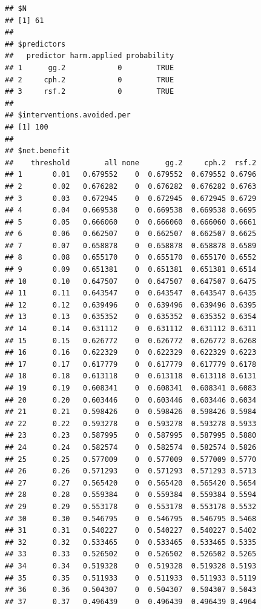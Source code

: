 \documentclass{article}\usepackage[]{graphicx}\usepackage[]{color}
\makeatletter
\newenvironment{kframe}{%
 \def\at@end@of@kframe{}%
 \ifinner\ifhmode%
  \def\at@end@of@kframe{\end{minipage}}%
  \begin{minipage}{\columnwidth}%
 \fi\fi%
 \def\FrameCommand##1{\hskip\@totalleftmargin \hskip-\fboxsep
 \colorbox{shadecolor}{##1}\hskip-\fboxsep
     \hskip-\linewidth \hskip-\@totalleftmargin \hskip\columnwidth}%
 \MakeFramed {\advance\hsize-\width
   \@totalleftmargin\z@ \linewidth\hsize
   \@setminipage}}%
 {\par\unskip\endMakeFramed%
 \at@end@of@kframe}
\newenvironment{knitrout}{}{} %
\makeatother
\begin{document}
\begin{knitrout}
{}


\begin{kframe}\begin{verbatim}
## $N
## [1] 61
## 
## $predictors
##   predictor harm.applied probability
## 1      gg.2            0        TRUE
## 2     cph.2            0        TRUE
## 3     rsf.2            0        TRUE
## 
## $interventions.avoided.per
## [1] 100
## 
## $net.benefit
##    threshold        all none      gg.2     cph.2  rsf.2
## 1       0.01   0.679552    0  0.679552  0.679552 0.6796
## 2       0.02   0.676282    0  0.676282  0.676282 0.6763
## 3       0.03   0.672945    0  0.672945  0.672945 0.6729
## 4       0.04   0.669538    0  0.669538  0.669538 0.6695
## 5       0.05   0.666060    0  0.666060  0.666060 0.6661
## 6       0.06   0.662507    0  0.662507  0.662507 0.6625
## 7       0.07   0.658878    0  0.658878  0.658878 0.6589
## 8       0.08   0.655170    0  0.655170  0.655170 0.6552
## 9       0.09   0.651381    0  0.651381  0.651381 0.6514
## 10      0.10   0.647507    0  0.647507  0.647507 0.6475
## 11      0.11   0.643547    0  0.643547  0.643547 0.6435
## 12      0.12   0.639496    0  0.639496  0.639496 0.6395
## 13      0.13   0.635352    0  0.635352  0.635352 0.6354
## 14      0.14   0.631112    0  0.631112  0.631112 0.6311
## 15      0.15   0.626772    0  0.626772  0.626772 0.6268
## 16      0.16   0.622329    0  0.622329  0.622329 0.6223
## 17      0.17   0.617779    0  0.617779  0.617779 0.6178
## 18      0.18   0.613118    0  0.613118  0.613118 0.6131
## 19      0.19   0.608341    0  0.608341  0.608341 0.6083
## 20      0.20   0.603446    0  0.603446  0.603446 0.6034
## 21      0.21   0.598426    0  0.598426  0.598426 0.5984
## 22      0.22   0.593278    0  0.593278  0.593278 0.5933
## 23      0.23   0.587995    0  0.587995  0.587995 0.5880
## 24      0.24   0.582574    0  0.582574  0.582574 0.5826
## 25      0.25   0.577009    0  0.577009  0.577009 0.5770
## 26      0.26   0.571293    0  0.571293  0.571293 0.5713
## 27      0.27   0.565420    0  0.565420  0.565420 0.5654
## 28      0.28   0.559384    0  0.559384  0.559384 0.5594
## 29      0.29   0.553178    0  0.553178  0.553178 0.5532
## 30      0.30   0.546795    0  0.546795  0.546795 0.5468
## 31      0.31   0.540227    0  0.540227  0.540227 0.5402
## 32      0.32   0.533465    0  0.533465  0.533465 0.5335
## 33      0.33   0.526502    0  0.526502  0.526502 0.5265
## 34      0.34   0.519328    0  0.519328  0.519328 0.5193
## 35      0.35   0.511933    0  0.511933  0.511933 0.5119
## 36      0.36   0.504307    0  0.504307  0.504307 0.5043
## 37      0.37   0.496439    0  0.496439  0.496439 0.4964

\end{verbatim}
\end{kframe}
\end{knitrout}
\end{document}

